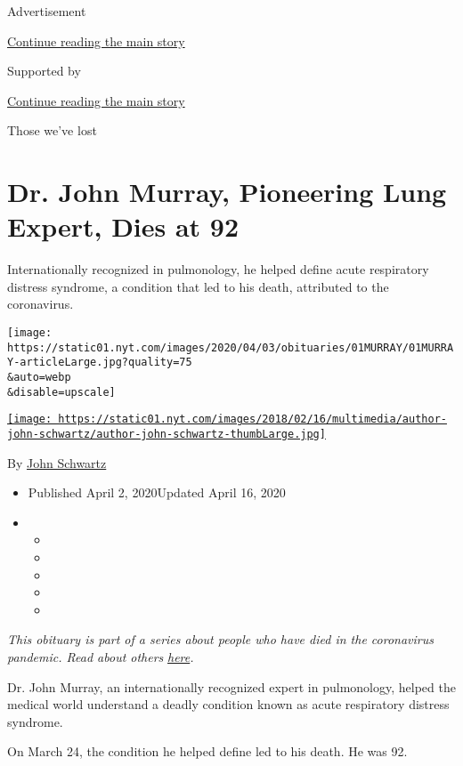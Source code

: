 Advertisement

\protect\hyperlink{after-top}{Continue reading the main story}

Supported by

\protect\hyperlink{after-sponsor}{Continue reading the main story}

Those we've lost

\hypertarget{dr-john-murray-pioneering-lung-expert-dies-at-92}{%
\section{Dr. John Murray, Pioneering Lung Expert, Dies at
92}\label{dr-john-murray-pioneering-lung-expert-dies-at-92}}

Internationally recognized in pulmonology, he helped define acute
respiratory distress syndrome, a condition that led to his death,
attributed to the coronavirus.

\texttt{[image: https://static01.nyt.com/images/2020/04/03/obituaries/01MURRAY/01MURRAY-articleLarge.jpg?quality=75\\\&auto=webp\\\&disable=upscale]}

\href{https://www.nytimes.com/by/john-schwartz}{\texttt{[image: https://static01.nyt.com/images/2018/02/16/multimedia/author-john-schwartz/author-john-schwartz-thumbLarge.jpg]}}

By \href{https://www.nytimes.com/by/john-schwartz}{John Schwartz}

\begin{itemize}
\item
  Published April 2, 2020Updated April 16, 2020
\item
  \begin{itemize}
  \item
  \item
  \item
  \item
  \item
  \end{itemize}
\end{itemize}

\emph{This obituary is part of a series about people who have died in
the coronavirus pandemic. Read about others}
\href{https://www.nytimes.com/series/people-who-have-died-of-the-coronavirus}{\emph{here}}\emph{.}

Dr. John Murray, an internationally recognized expert in pulmonology,
helped the medical world understand a deadly condition known as acute
respiratory distress syndrome.

On March 24, the condition he helped define led to his death. He was 92.

